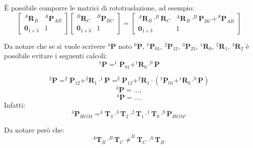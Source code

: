 ﻿\documentclass[11pt, a4paper]{article}
\begin{document}
È possibile comporre le matrici di rototraslazione, ad esempio:
\[
    \begin{bmatrix}
        ^{A}\mathbf{R}_{B} & ^{A}\mathbf{P}_{AB} \\
        \mathbf{0}_{1 \times 3} & 1
    \end{bmatrix}
        \begin{bmatrix}
        ^{B}\mathbf{R}_{C} & ^{B}\mathbf{P}_{BC} \\
        \mathbf{0}_{1 \times 3} & 1
    \end{bmatrix}
    =
    \begin{bmatrix}
        ^{A}\mathbf{R}_{B} \cdot ^{B}\mathbf{R}_{C} & ^{A}\mathbf{R}_{B} \cdot ^{B}\mathbf{P}_{BC} + ^{A}\mathbf{P}_{AB} \\
        \mathbf{0}_{1 \times 3} & 1
    \end{bmatrix}
\]

Da notare che se si vuole scrivere $ ^{4}\mathbf{P} $ noto $ ^{0}\mathbf{P} $,
$ ^{1}\mathbf{P}_{01} $, $ ^{2}\mathbf{P}_{12} $, $ ^{3}\mathbf{P}_{23} $,
$ ^{1}\mathbf{R}_{0} $, $ ^{2}\mathbf{R}_{1} $, $ ^{3}\mathbf{R}_{2} $ è
possibile evitare i seguenti calcoli:
\[
    ^{1}\mathbf{P} = ^{1}\mathbf{P}_{01} + ^{1}\mathbf{R}_{0} \cdot ^{0}\mathbf{P}
\]

\[
    ^{2}\mathbf{P} = ^{2}\mathbf{P}_{12} + ^{2}\mathbf{R}_{1} \cdot ^{1}\mathbf{P} = ^{2}\mathbf{P}_{12} + ^{2}\mathbf{R}_{1} \cdot \left( ^{1}\mathbf{P}_{01} + ^{1}\mathbf{R}_{0} \cdot ^{0}\mathbf{P} \right)
\]
\[
    ^{3}\mathbf{P} = \dots,
\]
\[
    ^{4}\mathbf{P} = \dots.
\]
Infatti:
\[
    ^{4}\mathbf{P}_{HOM} = ^{4}\mathbf{T}_{3} \cdot ^{3}\mathbf{T}_{2} \cdot ^{2}\mathbf{T}_{1} \cdot ^{1}\mathbf{T}_{0} \cdot ^{0}\mathbf{P}_{HOM}.
\]

Da notare però che:
\[
    ^{A}\mathbf{T}_{B} \cdot ^{B}\mathbf{T}_{C} \neq ^{B}\mathbf{T}_{C} \cdot ^{A}\mathbf{T}_{B}.
\]
\end{document}

